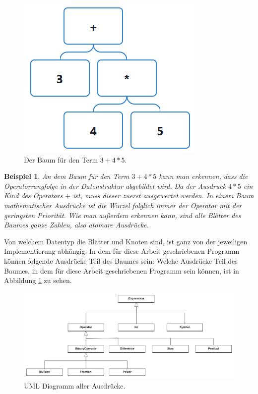 \documentclass[11pt]{article}
\newtheorem{example}{Beispiel}
\begin{document}
\begin{figure}[h]
  \centering
  \includegraphics[scale=0.5]{trees/beispiel_1_baum.png}
  \caption{Der Baum für den Term $3+4*5$.}
\end{figure}

\begin{example} \normalfont
   An dem Baum für den Term $3+4*5$ kann man erkennen, dass die Operatorrangfolge 
   in der Datenstruktur abgebildet wird. Da der Ausdruck $4*5$ ein Kind des Operators $+$ ist, muss dieser zuerst 
   ausgewertet werden. In einem Baum mathematischer Ausdrücke ist die Wurzel folglich immer
   der Operator mit der geringsten Priorität.
   Wie man außerdem erkennen kann, sind alle Blätter des Baumes ganze Zahlen, also atomare Ausdrücke.
\end{example}

Von welchem Datentyp die Blätter und Knoten sind, ist ganz von der jeweiligen Implementierung abhängig.
In dem für diese Arbeit geschriebenen Programm können folgende Ausdrücke Teil des Baumes sein:
Welche Ausdrücke Teil des Baumes, in dem für diese Arbeit geschriebenen Programm sein können, ist in 
Abbildung \ref{img:uml} zu sehen.

\begin{figure}[h]
  \centering
  \includegraphics[scale=0.25]{UML_Ausdruecke.png}
  \caption{UML Diagramm aller Ausdrücke.}
  \label{img:uml}
\end{figure}
\end{document}
